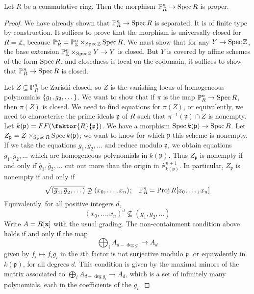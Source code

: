 \begin{proposition}
    Let \( R \) be a commutative ring.
    Then the morphism \( \mathbb P^n_R \to \operatorname{Spec} R \) is proper.
\end{proposition}
\begin{proof}
    We have already shown that \( \mathbb P^n_R \to \operatorname{Spec} R \) is separated.
    It is of finite type by construction.
    It suffices to prove that the morphism is universally closed for \( R = \mathbb Z \), because \( \mathbb P^n_R = \mathbb P^n_{\mathbb Z} \times_{\operatorname{Spec} \mathbb Z} \operatorname{Spec} R \).
    We must show that for any \( Y \to \operatorname{Spec} \mathbb Z \), the base extension \( \mathbb P^n_{\mathbb Z} \times_{\operatorname{Spec} \mathbb Z} Y \to Y \) is closed.
    But \( Y \) is covered by affine schemes of the form \( \operatorname{Spec} R \), and closedness is local on the codomain, it suffices to show that \( \mathbb P^n_R \to \operatorname{Spec} R \) is closed.

    Let \( Z \subseteq \mathbb P^n_R \) be Zariski closed, so \( Z \) is the vanishing locus of homogeneous polynomials \( \qty{g_1, g_2, \dots} \).
    We want to show that if \( \pi \) is the map \( \mathbb P^n_R \to \operatorname{Spec} R \), then \( \pi(Z) \) is closed.
    We need to find equations for \( \pi(Z) \), or equivalently, we need to characterise the prime ideals \( \mathfrak p \) of \( R \) such that \( \pi^{-1}(\mathfrak p) \cap Z \) is nonempty.
    Let \( k(\mathfrak p) = FF\qty(\faktor{R}{\mathfrak p}) \).
    We have a morphism \( \operatorname{Spec} k(\mathfrak p) \to \operatorname{Spec} R \).
    Let \( Z_{\mathfrak p} = Z \times_{\operatorname{Spec} R} \operatorname{Spec} k(\mathfrak p) \); we want to know for which \( \mathfrak p \) this scheme is nonempty.
    If we take the equations \( g_1, g_2, \dots \) and reduce modulo \( \mathfrak p \), we obtain equations \( \overline g_1, \overline g_2, \dots \) which are homogeneous polynomials in \( k(\mathfrak p) \).
    Thus \( Z_{\mathfrak p} \) is nonempty if and only if \( \overline g_1, \overline g_2, \dots \) cut out more than the origin in \( \mathbb A^{n+1}_{k(\mathfrak p)} \).
    In particular, \( Z_{\mathfrak p} \) is nonempty if and only if
    \[ \sqrt{(\overline g_1, \overline g_2, \dots)} \nsupseteq (x_0, \dots, x_n);\quad \mathbb P^n_R = \operatorname{Proj} R[x_0, \dots, x_n] \]
    Equivalently, for all positive integers \( d \),
    \[ (x_0, \dots, x_n)^d \nsubseteq (\overline g_1, \overline g_2, \dots) \]
    Write \( A = R[\vb x] \) with the usual grading.
    The non-containment condition above holds if and only if the map
    \[ \bigoplus_i A_{d - \deg g_i} \to A_d \]
    given by \( f_i \mapsto f_i g_i \) in the \( i \)th factor is not surjective modulo \( \mathfrak p \), or equivalently in \( k(\mathfrak p) \), for all degrees \( d \).
    This condition is given by the maximal minors of the matrix associated to \( \bigoplus_i A_{d - \deg g_i} \to A_d \), which is a set of infinitely many polynomials, each in the coefficients of the \( g_i \).
\end{proof}

